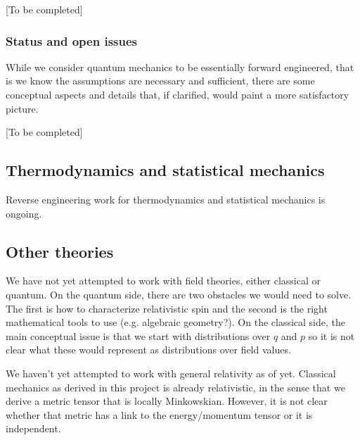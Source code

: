 \documentclass[twocolumn]{article}
\begin{document}
[To be completed]


\subsubsection{Status and open issues}

While we consider quantum mechanics to be essentially forward engineered, that is we know the assumptions are necessary and sufficient, there are some conceptual aspects and details that, if clarified, would paint a more satisfactory picture.

[To be completed]

\subsection{Thermodynamics and statistical mechanics}

Reverse engineering work for thermodynamics and statistical mechanics is ongoing.

\subsection{Other theories}

We have not yet attempted to work with field theories, either classical or quantum. On the quantum side, there are two obstacles we would need to solve. The first is how to characterize relativistic spin and the second is the right mathematical tools to use (e.g. algebraic geometry?). On the classical side, the main conceptual issue is that we start with distributions over $q$ and $p$ so it is not clear what these would represent as distributions over field values.

We haven't yet attempted to work with general relativity as of yet. Classical mechanics as derived in this project is already relativistic, in the sense that we derive a metric tensor that is locally Minkowskian. However, it is not clear whether that metric has a link to the energy/momentum tensor or it is independent.
\end{document}

